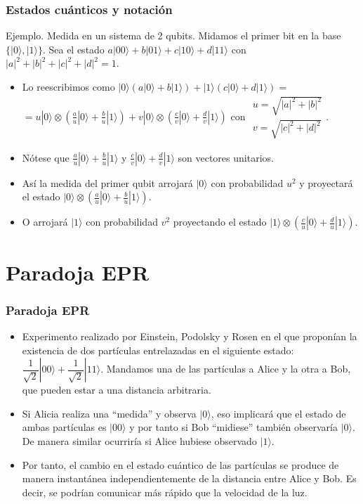 \documentclass{beamer}
\newcommand{\filados}[2]{ \left. \begin{array}{c}	#1 \\	#2	 \end{array} \right. }
\newcommand{\base}[1]{|#1\rangle}
\begin{document}
\begin{frame}
	\frametitle{Estados cuánticos y notación}
	\begin{block}{Ejemplo. Medida en un sistema de 2 qubits.}
	Midamos el primer bit en la base $\{\base0,\base1\}$. Sea el estado $a\base{00}+b\base{01}+c\base{10}+d\base{11}$ con $|a|^2+|b|^2+|c|^2+|d|^2=1$. 
	\end{block}
	\begin{itemize}
	\item Lo reescribimos como $\base0(a\base0+b\base1)+\base1(c\base0+d\base1)=$ $=u\base0\otimes(\frac{a}{u}\base0+\frac{b}{u}\base1) + v\base0\otimes(\frac{c}{v}\base0+\frac{d}{v}\base1)$ con $\filados{u=\sqrt{|a|^2+|b|^2}}{v=\sqrt{|c|^2+|d|^2}}$.
	\item Nótese que $\frac{a}{u}\base0+\frac{b}{u}\base1$ y $\frac{c}{v}\base0+\frac{d}{v}\base1$ son vectores unitarios.
	\item Así la medida del primer qubit arrojará $\base0$ con probabilidad $u^2$ y proyectará el estado $\base0\otimes(\frac{a}{u}\base0+\frac{b}{u}\base1)$.
	\item O arrojará $\base1$ con probabilidad $v^2$ proyectando el estado $\base1\otimes(\frac{c}{u}\base0+\frac{d}{u}\base1)$.
	\end{itemize}
\end{frame}

\section{Paradoja EPR}

\begin{frame}
	\frametitle{Paradoja EPR}
	\begin{itemize}
	\item Experimento realizado por Einstein, Podolsky y Rosen en el que proponían la existencia de dos partículas entrelazadas en el siguiente estado: $\dfrac{1}{\sqrt{2}} \base{00} + 		 		\dfrac{1}{\sqrt{2}} \base{11}$. Mandamos una de las partículas a Alice y la otra a Bob, que pueden estar a una distancia arbitraria. 
	\item Si Alicia realiza una ``medida'' y observa $\base0$, eso implicará que el estado de ambas partículas es  $\base {00}$ y por tanto si Bob ``midiese'' también observaría $\base0$. 		De manera similar ocurriría si Alice hubiese observado $\base1$.
	\item Por tanto, el cambio en el estado cuántico de las partículas se produce de manera instantánea independientemente de la distancia entre Alice y Bob. Es decir, se podrían 				comunicar más rápido que la velocidad de la luz. 
	\end{itemize}
\end{frame}
\end{document}
